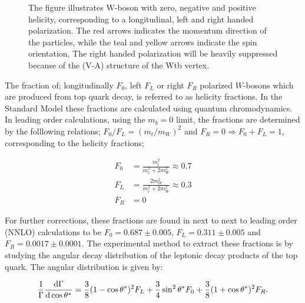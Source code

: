 \documentclass[12pt,a4paper]{article}
\numberwithin{equation}{section}
\begin{document}
\begin{figure}[H]
\begin{tikzpicture}
  \end{tikzpicture}
  \caption{The figure illustrates W-boson with zero, negative and positive
    helicity, corresponding to a longitudinal, left and right handed
    polarization. The red arrows indicates the momentum direction of the
    particles, while the teal and yellow arrows indicate the spin orientation,
    The right handed polarization will be heavily suppressed because of the
    (V-A) structure of the Wtb vertex.}\label{fig:polarization}
\end{figure}

The fraction of; longitudinally $F_0$, left $F_L$ or right $F_R$ polarized
$W$-bosons which are produced from top quark decay, is referred to as helicity
fractions. In the Standard Model these fractions are calculated using quantum
chromodynamics. In leading order calculations, using the $m_b = 0$ limit, the
fractions are determined by the folllowing relations; $F_0/F_L = (m_t/m_W)^2$
and $F_R = 0 \Rightarrow F_0 + F_L = 1$, corresponding to the helicity fractions;

\begin{align}
\label{eq:helfrac}
  F_0 &= \frac{m_t^2}{m_t^2 + 2 m_W^2} \approx 0.7\\
  F_L &= \frac{2 m_W^2}{m_t^2 + 2 m_W^2} \approx 0.3\\
  F_R &= 0
\end{align}

For further corrections, these fractions are found in next to next to leading
order (NNLO) calculations to be $F_0 = 0.687 \pm 0.005$, $F_L = 0.311 \pm 0.005$
and $F_R = 0.0017 \pm 0.0001$\cite{Czarnecki_2010}. The experimental method to
extract these fractions is by studying the angular decay distribution of the
leptonic decay products of the top quark. The angular distribution is given by:

\begin{equation}
  \frac{1}{\Gamma}\dv{\Gamma}{\cos \theta^*} = \frac{3}{8}(1-\cos \theta^*)^2 F_L +
  \frac{3}{4}\sin^2 \theta^* F_0 + \frac{3}{8}(1+\cos \theta^*)^2 F_R.
\end{equation}
\end{document}
